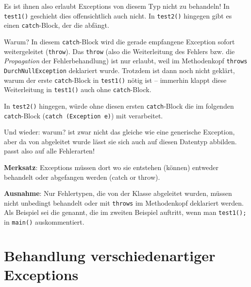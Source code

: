 Es ist ihnen also erlaubt Exceptions von diesem Typ nicht zu behandeln! In
\lstinline|test1()| geschieht dies offensichtlich auch nicht. In
\lstinline|test2()| hingegen gibt es einen \lstinline|catch|-Block, der die
 abfängt.

Warum? In diesem \lstinline|catch|-Block wird die gerade empfangene Exception
sofort weitergeleitet (\lstinline|throw|). Das \lstinline|throw| (also die
Weiterleitung des Fehlers bzw. die {\em Propagation} der Fehlerbehandlung)
ist nur erlaubt, weil im Methodenkopf \lstinline|throws DurchNullException|
deklariert wurde. Trotzdem ist dann noch nicht geklärt, warum der erste
\lstinline|catch|-Block in \lstinline|test1()| nötig ist -- immerhin klappt
diese Weiterleitung in \lstinline|test1()| auch ohne \lstinline|catch|-Block.

In \lstinline|test2()| hingegen, würde ohne diesen ersten
\lstinline|catch|-Block die  im folgenden
\lstinline|catch|-Block (\lstinline|catch (Exception e)|) mit \glqq
verarbeitet\grqq .

Und wieder: warum?  ist zwar nicht das gleiche wie
eine generische Exception, aber da  von
 abgeleitet wurde lässt sie sich auch auf diesen Datentyp
abbilden.  passt also auf alle Fehlerarten!

\textbf{Merksatz}: Exceptions müssen dort wo sie entstehen (können) entweder
behandelt oder abgefangen werden (\glqq catch or throw\grqq ).

\textbf{Ausnahme}: Nur Fehlertypen, die von der Klasse
 abgeleitet wurden, müssen nicht unbedingt behandelt
oder mit \lstinline|throws| im Methodenkopf deklariert werden. Als Beispiel sei
die  genannt,  die im zweiten Beispiel auftritt,
wenn man \lstinline|test1();| in \lstinline|main()| auskommentiert.


\section{Behandlung verschiedenartiger Exceptions}


